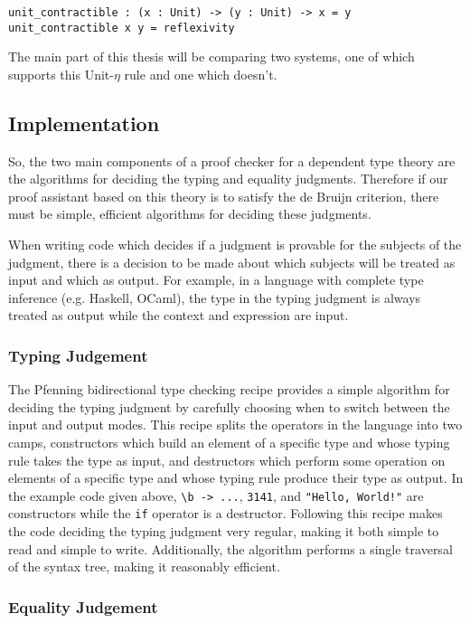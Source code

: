 \begin{verbatim}
unit_contractible : (x : Unit) -> (y : Unit) -> x = y
unit_contractible x y = reflexivity
\end{verbatim}

The main part of this thesis will be comparing two systems, one of which supports this Unit-$\eta$ rule and one which doesn't.

\subsection{Implementation}

So, the two main components of a proof checker for a dependent type theory are the algorithms for deciding the typing and equality judgments.
Therefore if our proof assistant based on this theory is to satisfy the de Bruijn criterion, there must be simple, efficient algorithms for deciding these judgments.

When writing code which decides if a judgment is provable for the subjects of the judgment, there is a decision to be made about which subjects will be treated as input and which as output.
For example, in a language with complete type inference (e.g. Haskell, OCaml), the type in the typing judgment is always treated as output while the context and expression are input.

\subsubsection{Typing Judgement}

The Pfenning bidirectional type checking recipe \citep{Dunfield2021} provides a simple algorithm for deciding the typing judgment by carefully choosing when to switch between the input and output modes.
This recipe splits the operators in the language into two camps, constructors which build an element of a specific type and whose typing rule takes the type as input, and destructors which perform some operation on elements of a specific type and whose typing rule produce their type as output.
In the example code given above, \verb|\b -> ...|, \verb|3141|, and \verb|"Hello, World!"| are constructors while the \verb|if| operator is a destructor.
Following this recipe makes the code deciding the typing judgment very regular, making it both simple to read and simple to write.
Additionally, the algorithm performs a single traversal of the syntax tree, making it reasonably efficient.

\subsubsection{Equality Judgement}

